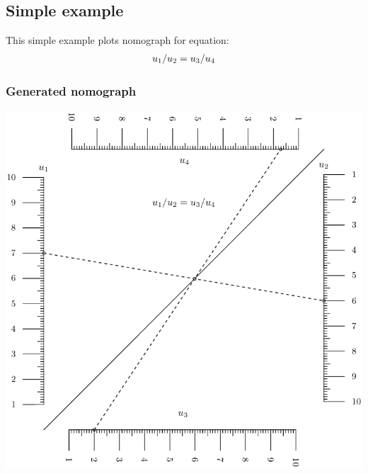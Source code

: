 \documentclass[a4paper,11pt,english]{sphinxmanual}
\begin{document}
\subsection{Simple example}
\label{types/types:id12}
This simple example plots nomograph for equation:
\begin{gather}
\begin{split}u_1 / u_2 = u_3 / u_4\end{split}\notag
\end{gather}

\subsubsection{Generated nomograph}
\label{types/types:id13}
\includegraphics{ex_type4_nomo_1.pdf}
\end{document}
